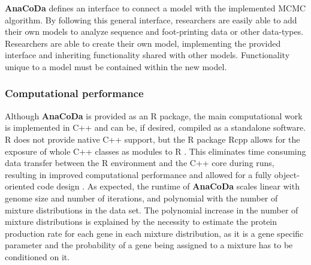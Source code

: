 \documentclass{bioinfo}
\newcommand{\package}{\textbf{AnaCoDa }} %
\begin{document}

\package defines an interface to connect a model with the implemented MCMC algorithm. 
By following this general interface, researchers are easily able to add their own models to analyze sequence and foot-printing data or other data-types.
Researchers are able to create their own model, implementing the provided interface and inheriting functionality shared with other models.
Functionality unique to a model must be contained within the new model. 

\subsubsection*{Computational performance}
Although \package is provided as an R package, the main computational work is implemented in C++ and can be, if desired, compiled as a standalone software.
R does not provide native C++ support, but the R package Rcpp allows for the exposure of whole C++ classes as modules to R \citep{rcpp_package}.
This eliminates time consuming data transfer between the R environment and the C++ core during runs, resulting in improved computational performance and allowed for a fully object-oriented code design \cite{ood_book}. 
As expected, the runtime of \package scales linear with genome size and number of iterations, and polynomial with the number of mixture distributions in the data set. The polynomial increase in the number of mixture distributions is explained by the necessity to estimate the protein production rate for each gene in each mixture distribution, as it is a gene specific parameter and the probability of a gene being assigned to a mixture has to be conditioned on it.



\end{document}
